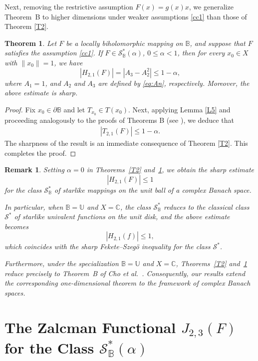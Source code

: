 \documentclass[11pt, reqno]{amsart}
\newtheorem{theo}{Theorem}[section]
\newtheorem{rem}{Remark}[section]
\numberwithin{equation}{section}
\begin{document}
\medskip
Next, removing the restrictive assumption $F(x)=g(x)x$, we generalize Theorem~B to higher dimensions under weaker assumptions \eqref{cc1} than those of Theorem \ref{T2}. 
\begin{theo}\label{T2.1}
Let $F$ be a locally biholomorphic mapping on $\mathbb{B}$, and suppose that $F$ satisfies the assumption \eqref{cc1}. If $F\in\mathcal{S}^*_\mathbb{B}(\alpha)$, $0\leq \alpha <1$, then for every $x_0\in X$ with $\|x_0\|=1$, we have
\[
|H_{2,1}(F)|=|A_3-A_2^2|\leq 1-\alpha,
\]
 where $A_1=1$, and $A_2$ and $A_3$ are defined by
\eqref{eq:An}, respectively. Moreover, the above estimate is sharp.
\end{theo}
\begin{proof} Fix $x_0\in \partial{\mathbb{B}}$ and let $T_{x_0}\in T(x_0)$. Next, applying Lemma \ref{L5} and proceeding analogously to the proofs of Theorems B (see \cite[Theorem 2.5]{CKKLS2018}), we deduce that
\begin{align*}
|T_{2,1}(F)|\leq 1-\alpha.
\end{align*}
 The sharpness of the result is an immediate consequence of Theorem \ref{T2}. This completes the proof.\end{proof}
 \begin{rem}
Setting $\alpha=0$ in Theorems~\ref{T2} and~\ref{T2.1}, we obtain the sharp estimate
\[
|H_{2,1}(F)|\leq 1
\]
for the class $\mathcal{S}_{\mathbb{B}}^{*}$ of starlike mappings on the unit ball of a complex Banach space.

In particular, when $\mathbb{B}=\mathbb{U}$ and $X=\mathbb{C}$, the class $\mathcal{S}_{\mathbb{B}}^{*}$ reduces to the classical class $\mathcal{S}^{*}$ of starlike univalent functions on the unit disk, and the above estimate becomes
\[
|H_{2,1}(f)|\leq 1,
\]
which coincides with the sharp Fekete--Szeg\"o inequality for the class $\mathcal{S}^{*}$.

Furthermore, under the specialization $\mathbb{B}=\mathbb{U}$ and $X=\mathbb{C}$, Theorems~\ref{T2} and~\ref{T2.1} reduce precisely to Theorem~B of Cho \emph{et al.}~\cite[Theorem~2.3]{CKKLS2018}. Consequently, our results extend the corresponding one-dimensional theorem to the framework of complex Banach spaces.
\end{rem}
 
 \section{\texorpdfstring{\bf The Zalcman Functional $J_{2,3}(F)$ for the Class $\mathcal{S}^*_\mathbb{B}(\alpha)$}{The Zalcman Functional}}
\end{document}
